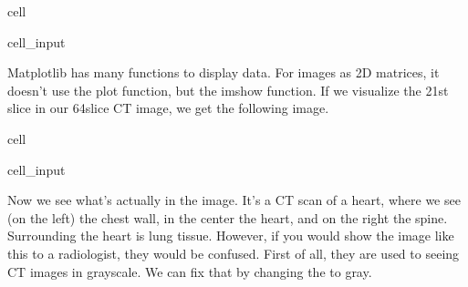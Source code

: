 \documentclass[letterpaper,10pt,english]{jupyterBook}
\begin{document}
\begin{sphinxuseclass}{cell}\begin{sphinxVerbatimInput}

\begin{sphinxuseclass}{cell_input}
\begin{sphinxVerbatim}[commandchars=\\\{\}]
   

  
    
  
 
\end{sphinxVerbatim}

\end{sphinxuseclass}\end{sphinxVerbatimInput}

\end{sphinxuseclass}
\sphinxAtStartPar
Matplotlib has many functions to display data. For images as 2D matrices, it doesn’t use the plot function, but the imshow function. If we visualize the 21st slice in our 64\sphinxhyphen{}slice CT image, we get the following image.

\begin{sphinxuseclass}{cell}\begin{sphinxVerbatimInput}

\begin{sphinxuseclass}{cell_input}
\begin{sphinxVerbatim}[commandchars=\\\{\}]
\PYG{p}{[}  \PYG{p}{]}
\end{sphinxVerbatim}

\end{sphinxuseclass}\end{sphinxVerbatimInput}

\end{sphinxuseclass}
\sphinxAtStartPar
Now we see what’s actually in the image. It’s a CT scan of a heart, where we see (on the left) the chest wall, in the center the heart, and on the right the spine. Surrounding the heart is lung tissue. However, if you would show the image like this to a radiologist, they would be confused. First of all, they are used to seeing CT images in grayscale. We can fix that by changing the  to gray.
\end{document}
